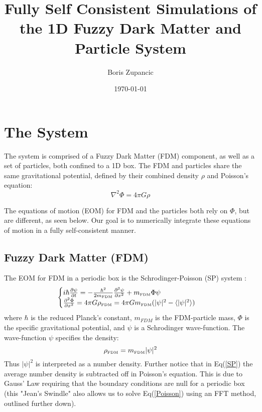 \documentclass[oneside]{book}
\title{Fully Self Consistent Simulations of the 1D Fuzzy Dark Matter and Particle System}
\author{Boris Zupancic}
\date{\today}
\newcommand{\pd}{\partial}
\begin{document}
\maketitle

\tableofcontents

\chapter{The System}

The system is comprised of a Fuzzy Dark Matter (FDM) component, as well as a set of particles, both confined to a 1D box. The FDM and particles share the same gravitational potential, defined by their combined density $\rho$ and Poisson's equation: 
\begin{equation}
\nabla^2 \Phi = 4\pi G \rho    
\label{Poisson}
\end{equation}

The equations of motion (EOM) for FDM and the particles both rely on $\Phi$, but are different, as seen below. Our goal is to numerically integrate these equations of motion in a fully self-consistent manner.

\section{Fuzzy Dark Matter (FDM)}
The EOM for FDM in a periodic box is the Schrodinger-Poisson (SP) system :
\begin{equation}
    \begin{cases}
    i\hbar \frac{\pd \psi}{\pd t} = -\frac{\hbar^2}{2 m_\text{\tiny{FDM}}} \frac{\pd^2 \psi}{\pd x^2} + m_\text{\tiny{FDM}} \Phi \psi 
    \\
    \frac{\pd^2 \Phi}{\pd x^2} = 4\pi G \rho_\text{\tiny{FDM}}= 4\pi G m_\text{\tiny{FDM}} (|\psi|^2 - \langle |\psi|^2 \rangle)
    \end{cases}
    \label{SP}
\end{equation}
where $\hbar$ is the reduced Planck's constant, $m_{FDM}$ is the FDM-particle mass, $\Phi$ is the specific gravitational potential, and $\psi$ is a Schrodinger wave-function. The wave-function $\psi$ specifies the density:
$$\rho_\text{\tiny{FDM}} = m_\text{\tiny{FDM}}|\psi|^2$$
Thus $|\psi|^2$ is interpreted as a number density. Further notice that in Eq(\ref{SP}) the average number density is subtracted off in Poisson's equation. This is due to Gauss' Law requiring that the boundary conditions are null for a periodic box (this "Jean's Swindle" also allows us to solve Eq(\ref{Poisson}) using an FFT method, outlined further down). 
\end{document}
